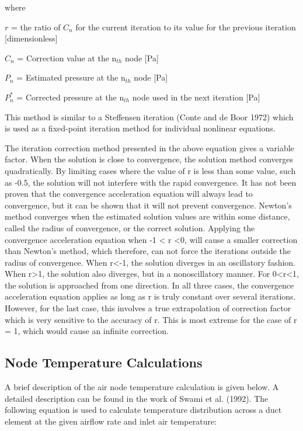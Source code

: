 where

\(r\) = the ratio of \(C_{n}\) for the current iteration to its value for the previous iteration {[}dimensionless{]}

\(C_{n}\) = Correction value at the n\(_{th}\) node {[}Pa{]}

\(P_{n}\) = Estimated pressure at the n\(_{th}\) node {[}Pa{]}

\(P_{n}^{*}\) = Corrected pressure at the n\(_{th}\) node used in the next iteration {[}Pa{]}

This method is similar to a Steffensen iteration (Conte and de Boor 1972) which is used as a fixed-point iteration method for individual nonlinear equations.

The iteration correction method presented in the above equation gives a variable factor. When the solution is close to convergence, the solution method converges quadratically. By limiting cases where the value of r is less than some value, such as -0.5, the solution will not interfere with the rapid convergence. It has not been proven that the convergence acceleration equation will always lead to convergence, but it can be shown that it will not prevent convergence. Newton's method converges when the estimated solution values are within some distance, called the radius of convergence, or the correct solution. Applying the convergence acceleration equation when -1 \textless{} r \textless{}0, will cause a smaller correction than Newton's method, which therefore, can not force the iterations outside the radius of convergence. When r\textless{}-1, the solution diverges in an oscillatory fashion. When r\textgreater{}1, the solution also diverges, but in a nonoscillatory manner. For 0\textless{}r\textless{}1, the solution is approached from one direction. In all three cases, the convergence acceleration equation applies as long as r is truly constant over several iterations. However, for the last case, this involves a true extrapolation of correction factor which is very sensitive to the accuracy of r. This is most extreme for the case of r = 1, which would cause an infinite correction.

\subsection{Node Temperature Calculations}\label{node-temperature-calculations}

A brief description of the air node temperature calculation is given below. A detailed description can be found in the work of Swami et al. (1992). The following equation is used to calculate temperature distribution across a duct element at the given airflow rate and inlet air temperature:

